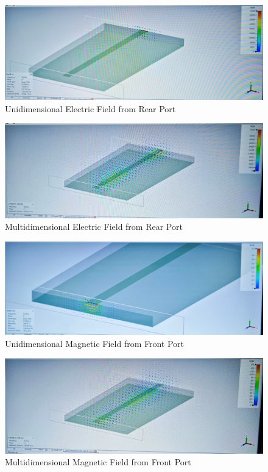 \documentclass[
	letterpaper, %
	10pt, %
]{CSUniSchoolLabReport}
\begin{document}
\begin{figure}[H]
  \centering
  \includegraphics[width=.9\textwidth]{Figures/Lab Four/Rear_EField.jpg}
  \caption{Unidimensional Electric Field from Rear Port}
  \label{fig:7}
\end{figure}

\begin{figure}[H]
  \centering
  \includegraphics[width=.9\textwidth]{Figures/Lab Four/Rear_EField_3D.jpg}
  \caption{Multidimensional Electric Field from Rear Port}
  \label{fig:8}
\end{figure}

\begin{figure}[H]
  \centering
  \includegraphics[width=.9\textwidth]{Figures/Lab Four/Front_BField.jpg}
  \caption{Unidimensional Magnetic Field from Front Port}
  \label{fig:9}
\end{figure}

\begin{figure}[H]
  \centering
  \includegraphics[width=.9\textwidth]{Figures/Lab Four/Front_BField_3D.jpg}
  \caption{Multidimensional Magnetic Field from Front Port}
  \label{fig:10}
\end{figure}
\end{document}
